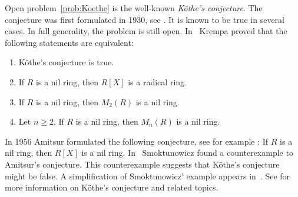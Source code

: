 Open problem~\ref{prob:Koethe} is the well-known \emph{K\"othe's conjecture}. 
The conjecture was first formulated in 1930, see \cite{MR1545158}. It is known to be true
in several cases. In full generality, the problem is still open. In~\cite{MR306251} 
Krempa proved that
the following statements are equivalent:
\begin{enumerate}
    \item K\"othe's conjecture is true.  
    \item If $R$ is a nil ring, then $R[X]$ is a radical ring. 
    \item If $R$ is a nil ring, then $M_2(R)$ is a nil ring. 
    \item Let $n\geq2$. If $R$ is a nil ring, then $M_n(R)$ is a nil ring. 
\end{enumerate}

In 1956 Amitsur formulated the following conjecture, see for example
\cite{MR0347873}: If $R$ is a nil ring, then $R[X]$ is a nil ring. In~\cite{MR1793911} 
Smoktunowicz found a counterexample to Amitsur's conjecture. 
This counterexample suggests that K\"othe's conjecture might be false. 
A simplification of Smoktunowicz' example
appears in~\cite{MR3169522}. See \cite{MR1879880,MR2275597} for more
information on K\"othe's conjecture and related topics. 

